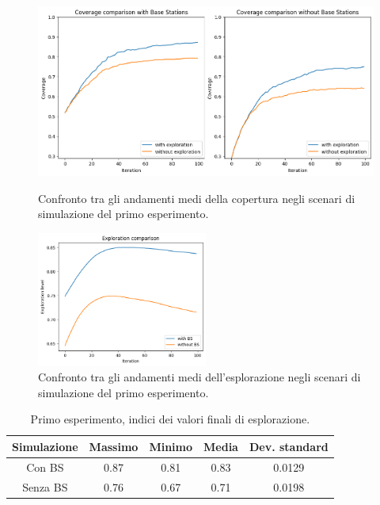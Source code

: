 \begin{figure}
    \centering
    \includegraphics[width=1\textwidth]{img/ch4/experiment1/coverage_comparison.png}
    \caption[Grafici di copertura nel primo esperimento]{Confronto tra gli andamenti medi della copertura negli scenari di simulazione del primo esperimento.}
    \label{fig:confronto_cov_exp1}

    \includegraphics[width=0.5\textwidth]{img/ch4/experiment1/exploration_comparison.png}
    \caption[Grafici di esplorazione nel primo esperimento]{Confronto tra gli andamenti medi dell'esplorazione negli scenari di simulazione del primo esperimento.}
    \label{fig:confronto_expl_exp1}
\end{figure}

\begin{table}[t]
\centering
\begin{tabular}{|c|c|c|c|c|}
\hline
Simulazione & Massimo & Minimo & Media & Dev. standard \\
\hline
Con BS & 0.87 & 0.81 & 0.83 & 0.0129 \\
Senza BS & 0.76 & 0.67 & 0.71 & 0.0198 \\
\hline
\end{tabular}
\caption{\label{tab:exp1_expl_statistics}Primo esperimento, indici dei valori finali di esplorazione.}
\end{table}

